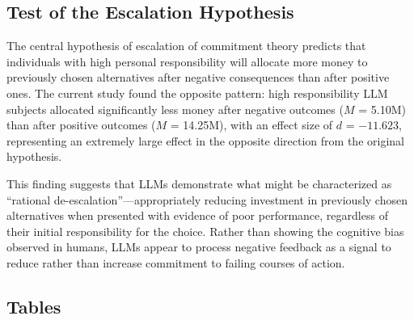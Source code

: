 \documentclass{article}
\begin{document}
\subsection{Test of the Escalation Hypothesis}

The central hypothesis of escalation of commitment theory predicts that individuals with high personal responsibility will allocate more money to previously chosen alternatives after negative consequences than after positive ones. The current study found the opposite pattern: high responsibility LLM subjects allocated significantly less money after negative outcomes ($M$ = 5.10M) than after positive outcomes ($M$ = 14.25M), with an effect size of $d$ = $-11.623$, representing an extremely large effect in the opposite direction from the original hypothesis.

This finding suggests that LLMs demonstrate what might be characterized as ``rational de-escalation''---appropriately reducing investment in previously chosen alternatives when presented with evidence of poor performance, regardless of their initial responsibility for the choice. Rather than showing the cognitive bias observed in humans, LLMs appear to process negative feedback as a signal to reduce rather than increase commitment to failing courses of action.

\newpage

\subsection{Tables}
\end{document}
